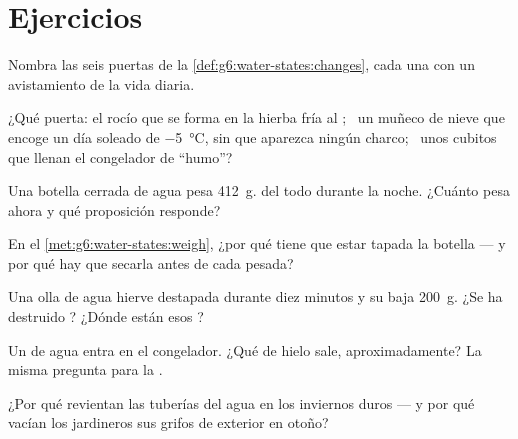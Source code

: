 \section{Ejercicios}

\begin{exercise}[$\star$]\label{exo:g6:water-states:1}
Nombra las seis puertas de la \cref{def:g6:water-states:changes},
cada una con un avistamiento de la vida diaria.
\end{exercise}

\begin{exercise}[$\star$]\label{exo:g6:water-states:2}
¿Qué puerta: el rocío que se forma en la hierba fría al ; \ un
muñeco de nieve que encoge un día soleado de \qty{-5}{\celsius}, sin
que aparezca ningún charco; \ unos cubitos que llenan el congelador de
``humo''?
\end{exercise}

\begin{exercise}[$\star$]\label{exo:g6:water-states:3}
Una botella cerrada de agua pesa \qty{412}{g}.  del todo
durante la noche. ¿Cuánto pesa ahora y qué proposición responde?
\end{exercise}

\begin{exercise}[$\star$]\label{exo:g6:water-states:4}
En el \cref{met:g6:water-states:weigh}, ¿por qué tiene que estar
tapada la botella --- y por qué hay que secarla antes de cada pesada?
\end{exercise}

\begin{exercise}[$\star$]\label{exo:g6:water-states:5}
Una olla de agua hierve destapada durante diez minutos y su
 baja \qty{200}{g}. ¿Se ha destruido ? ¿Dónde están esos
?
\end{exercise}

\begin{exercise}[$\star$]\label{exo:g6:water-states:6}
Un  de agua entra en el congelador. ¿Qué  de hielo
sale, aproximadamente? La misma pregunta para la .
\end{exercise}

\begin{exercise}[$\star$]\label{exo:g6:water-states:7}
¿Por qué revientan las tuberías del agua en los inviernos duros --- y
por qué vacían los jardineros sus grifos de exterior en otoño?
\end{exercise}


